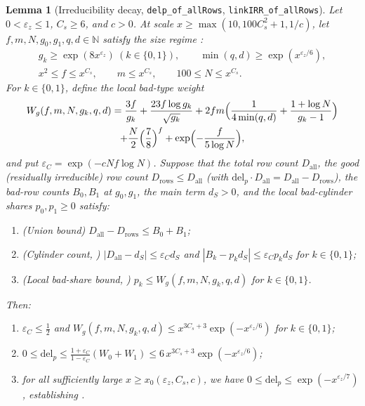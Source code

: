 \documentclass[11pt]{amsart}
\newcommand{\N}{\mathbb{N}}
\newcommand{\eps}{\varepsilon}
\theoremstyle{plain}
\newtheorem{lemma}[theorem]{Lemma}
\theoremstyle{definition}
\numberwithin{equation}{section}
\begin{document}
\begin{lemma}[Irreducibility decay, \texttt{delp\_of\_allRows}, \texttt{linkIRR\_of\_allRows}]\label{lem:linkIRR}
Let $0<\eps_z\le 1$, $C_s\ge 6$, and $c>0$. At scale $x\ge\max(10, 100 C_s^2+1, 1/c)$, let
$f,m,N,g_0,g_1,q,d\in\N$ satisfy the size regime :
\begin{gather*}
g_k\ge\exp(8 x^{\eps_z})\ (k\in\{0,1\}),\qquad \min(q,d)\ge\exp(x^{\eps_z/6}),\\
x^2\le f\le x^{C_s},\qquad m\le x^{C_s},\qquad 100\le N\le x^{C_s}.
\end{gather*}
For $k\in\{0,1\}$, define the local bad-type weight
\begin{multline}\label{eq:Wg}
W_g(f,m,N,g_k,q,d)=\frac{3f}{g_k}+\frac{23f\log g_k}{\sqrt{g_k}}
+2fm\Bigl(\frac{1}{4\min(q,d)}+\frac{1+\log N}{g_k-1}\Bigr)\\
+\frac{N}{2}\Bigl(\frac{7}{8}\Bigr)^f+\exp\Bigl(-\frac{f}{5\log N}\Bigr),
\end{multline}
and put $\varepsilon_C=\exp(-c N f\log N)$. Suppose that the total row count $D_{\mathrm{all}}$,
the good (residually irreducible) row count $D_{\mathrm{rows}}\le D_{\mathrm{all}}$ (with
$\mathrm{del}_p\cdot D_{\mathrm{all}}=D_{\mathrm{all}}-D_{\mathrm{rows}}$), the bad-row counts
$B_0,B_1$ at $g_0,g_1$, the main term $d_S>0$, and the local bad-cylinder shares $p_0,p_1\ge0$
satisfy:
\begin{enumerate}[label=(\alph*)]
\item \textup{(Union bound)} $D_{\mathrm{all}}-D_{\mathrm{rows}}\le B_0+B_1$;
\item \textup{(Cylinder count, )} $|D_{\mathrm{all}}-d_S|\le\varepsilon_C d_S$
  and $|B_k-p_k d_S|\le\varepsilon_C p_k d_S$ for $k\in\{0,1\}$;
\item \textup{(Local bad-share bound, )}
  $p_k\le W_g(f,m,N,g_k,q,d)$ for $k\in\{0,1\}$.
\end{enumerate}
Then:
\begin{enumerate}[label=(\roman*)]
\item $\varepsilon_C\le\frac12$ and $W_g(f,m,N,g_k,q,d)\le x^{3C_s+3}\exp(-x^{\eps_z/6})$ for
  $k\in\{0,1\}$;
\item $0\le\mathrm{del}_p\le \frac{1+\varepsilon_C}{1-\varepsilon_C}(W_0+W_1)\le
  6\,x^{3C_s+3}\exp(-x^{\eps_z/6})$;
\item for all sufficiently large $x\ge x_0(\eps_z,C_s,c)$, we have
  $0\le\mathrm{del}_p\le\exp(-x^{\eps_z/7})$, establishing .
\end{enumerate}
\end{lemma}
\end{document}
